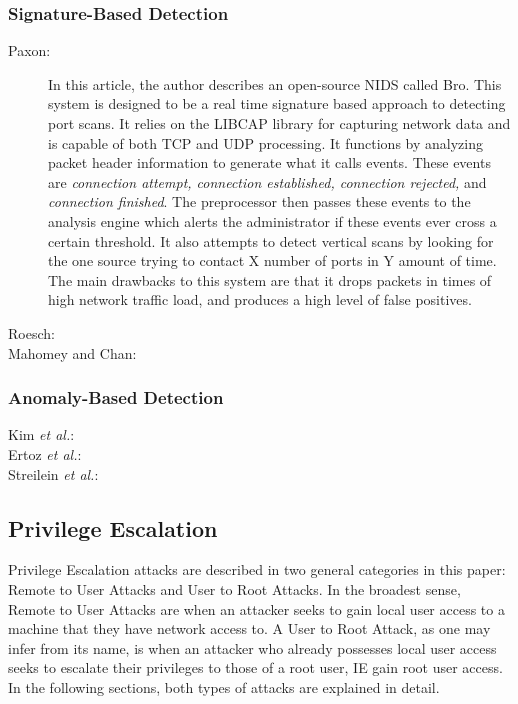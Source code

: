 \documentclass{acm_proc_article-sp}
\begin{document}
		\subsubsection{Signature-Based Detection}
		\begin{description}
			\item[Paxon:]
				In this article, the author describes an open-source NIDS called Bro. This system is designed to be a real time signature based approach to detecting port scans. It relies on the LIBCAP library for capturing network data and is capable of both TCP and UDP processing. It functions by analyzing packet header information to generate what it calls events. These events are \emph{connection attempt, connection established, connection rejected,} and \emph{connection finished}. The preprocessor then passes these events to the analysis engine which alerts the administrator if these events ever cross a certain threshold. It also attempts to detect vertical scans by looking for the one source trying to contact X number of ports in Y amount of time. The main drawbacks to this system are that it drops packets in times of high network traffic load, and produces a high level of false positives. 
			\item[Roesch:]
			\item[Mahomey and Chan:]
		\end{description}
		\subsubsection{Anomaly-Based Detection}
		\begin{description}
			\item[Kim \emph{et al.}:]
			\item[Ertoz \emph{et al.}:]
			\item[Streilein \emph{et al.}:]
		\end{description}
		
    
    \subsection{Privilege Escalation} %
    Privilege Escalation attacks are described in two general categories in this paper: Remote to User Attacks and User to Root Attacks. In the broadest sense, Remote to User Attacks are when an attacker seeks to gain local user access to a machine that they have network access to. A User to Root Attack, as one may infer from its name, is when an attacker who already possesses local user access seeks to escalate their privileges to those of a root user, IE gain root user access. In the following sections, both types of attacks are explained in detail.
\end{document}
